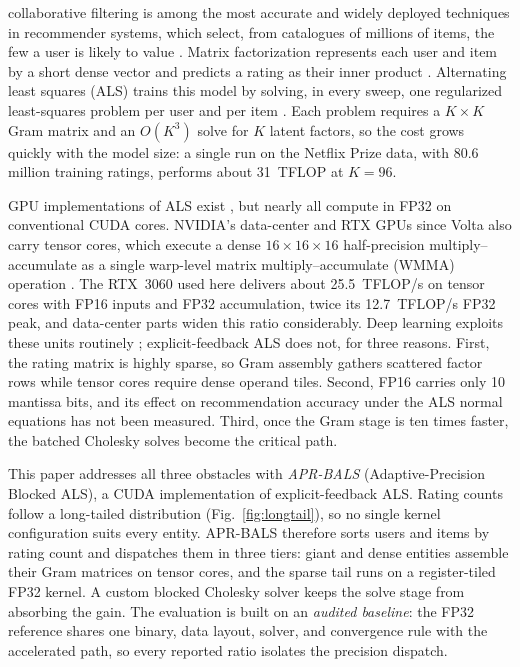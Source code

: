 
 collaborative filtering is among the most accurate and widely deployed techniques in recommender systems, which select, from catalogues of millions of items, the few a user is likely to value \cite{gomez2016netflix,schafer2001ecommerce}. Matrix factorization represents each user and item by a short dense vector and predicts a rating as their inner product \cite{koren2009matrix,bennett2007netflix}. Alternating least squares (ALS) trains this model by solving, in every sweep, one regularized least-squares problem per user and per item \cite{zhou2008largescale}. Each problem requires a $K \times K$ Gram matrix and an $O(K^{3})$ solve for $K$ latent factors, so the cost grows quickly with the model size: a single run on the Netflix Prize data, with 80.6 million training ratings, performs about 31~TFLOP at $K=96$.

GPU implementations of ALS exist \cite{tan2016faster,gates2015accelerating,chen2021bals}, but nearly all compute in FP32 on conventional CUDA cores. NVIDIA's data-center and RTX GPUs since Volta also carry tensor cores, which execute a dense $16 \times 16 \times 16$ half-precision multiply--accumulate as a single warp-level matrix multiply--accumulate (WMMA) operation \cite{markidis2018nvidia}. The RTX~3060 used here delivers about 25.5~TFLOP/s on tensor cores with FP16 inputs and FP32 accumulation, twice its 12.7~TFLOP/s FP32 peak, and data-center parts widen this ratio considerably. Deep learning exploits these units routinely \cite{micikevicius2018mixed}; explicit-feedback ALS does not, for three reasons. First, the rating matrix is highly sparse, so Gram assembly gathers scattered factor rows while tensor cores require dense operand tiles. Second, FP16 carries only 10 mantissa bits, and its effect on recommendation accuracy under the ALS normal equations has not been measured. Third, once the Gram stage is ten times faster, the batched Cholesky solves become the critical path.

This paper addresses all three obstacles with \textit{APR-BALS} (Adaptive-Precision Blocked ALS), a CUDA implementation of explicit-feedback ALS. Rating counts follow a long-tailed distribution (Fig.~\ref{fig:longtail}), so no single kernel configuration suits every entity. APR-BALS therefore sorts users and items by rating count and dispatches them in three tiers: giant and dense entities assemble their Gram matrices on tensor cores, and the sparse tail runs on a register-tiled FP32 kernel. A custom blocked Cholesky solver keeps the solve stage from absorbing the gain. The evaluation is built on an \textit{audited baseline}: the FP32 reference shares one binary, data layout, solver, and convergence rule with the accelerated path, so every reported ratio isolates the precision dispatch.

